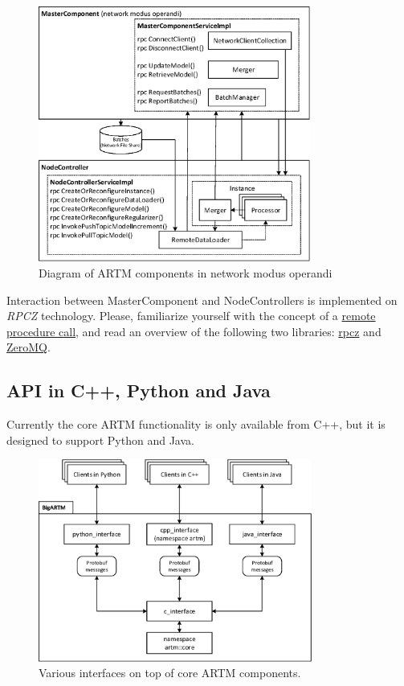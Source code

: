 \documentclass[11pt,a4paper,twoside]{report}
\begin{document}
\begin{figure}[h!]
\begin{centering}
\includegraphics[height=84mm]{diagramm_artm_network.eps}
\caption{Diagram of ARTM components in network modus operandi}
\label{fig:diagramm_artm_network}
\end{centering}
\end{figure}
\vspace{1ex}

Interaction between MasterComponent and NodeControllers is implemented on \emph{RPCZ} technology.
Please, familiarize yourself with the concept of a
\href{en.wikipedia.org/wiki/Remote_procedure_call}{remote procedure call}, 
and read an overview of the following two libraries:
\href{code.google.com/p/rpcz/}{rpcz} and \href{http://zeromq.org}{ZeroMQ}.

\subsection{API in C++, Python and Java}
Currently the core ARTM functionality is only available from C++,
but it is designed to support Python and Java.

\begin{figure}[h!]
\begin{centering}
\includegraphics[width=90mm]{diagramm_BigARTM.eps}
\caption{Various interfaces on top of core ARTM components.}
\label{fig:diagramm_BigARTM}
\end{centering}
\end{figure}
\end{document}
